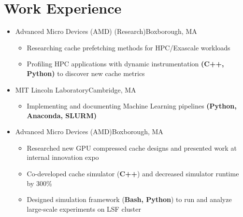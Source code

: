 \documentclass[11pt,letterpaper,sans]{moderncv}
\begin{document}
\section{Work Experience}

\vspace{1pt}

\begin{itemize}

\item[] {
{Advanced Micro Devices (AMD) (Research)}{Boxborough, MA}{}{\vspace{1pt}}
\vspace{-8pt}	\begin{itemize}
	 \item Researching cache prefetching methods for HPC/Exascale workloads
	 \item Profiling HPC applications with dynamic instrumentation \textbf{(C++, Python)} to discover new cache metrics
	\end{itemize}
}
\vspace{6pt}


\item[] {
{MIT Lincoln Laboratory}{Cambridge, MA}{}{\vspace{1pt}}
\vspace{-8pt}	\begin{itemize}
	 \item Implementing and documenting Machine Learning pipelines \textbf{(Python, Anaconda, SLURM)}
	\end{itemize}
}
\vspace{6pt}

\item[] {
{Advanced Micro Devices (AMD)}{Boxborough, MA}{}{\vspace{1pt}}
\vspace{-8pt}	\begin{itemize}
	 \item Researched new GPU compressed cache designs and presented work at internal innovation expo
	 \item Co-developed cache simulator (\textbf{C++}) and decreased simulator runtime by 300\%
	 \item Designed simulation framework (\textbf{Bash, Python}) to run and analyze large-scale experiments on LSF cluster
	\end{itemize}
}
\vspace{6pt}


\end{itemize}
\end{document}
